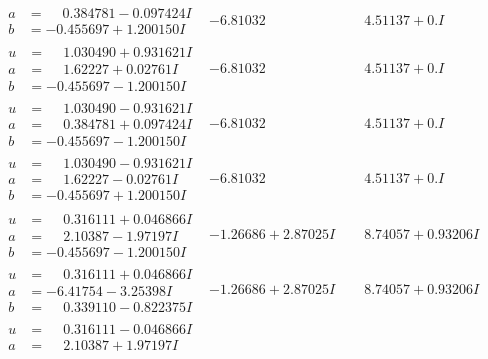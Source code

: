 \documentclass[1p]{elsarticle_modified}
\theoremstyle{definition}
\begin{document}
$$\begin{array}{c|c|c}
\begin{aligned}
a &= \phantom{-}0.384781 - 0.097424 I \\
b &= -0.455697 + 1.200150 I\end{aligned}
 & -6.81032\phantom{ +0.000000I} & \phantom{-}4.51137 + 0. I\phantom{ +0.000000I} \\ \hline\begin{aligned}
u &= \phantom{-}1.030490 + 0.931621 I \\
a &= \phantom{-}1.62227 + 0.02761 I \\
b &= -0.455697 - 1.200150 I\end{aligned}
 & -6.81032\phantom{ +0.000000I} & \phantom{-}4.51137 + 0. I\phantom{ +0.000000I} \\ \hline\begin{aligned}
u &= \phantom{-}1.030490 - 0.931621 I \\
a &= \phantom{-}0.384781 + 0.097424 I \\
b &= -0.455697 - 1.200150 I\end{aligned}
 & -6.81032\phantom{ +0.000000I} & \phantom{-}4.51137 + 0. I\phantom{ +0.000000I} \\ \hline\begin{aligned}
u &= \phantom{-}1.030490 - 0.931621 I \\
a &= \phantom{-}1.62227 - 0.02761 I \\
b &= -0.455697 + 1.200150 I\end{aligned}
 & -6.81032\phantom{ +0.000000I} & \phantom{-}4.51137 + 0. I\phantom{ +0.000000I} \\ \hline\begin{aligned}
u &= \phantom{-}0.316111 + 0.046866 I \\
a &= \phantom{-}2.10387 - 1.97197 I \\
b &= -0.455697 - 1.200150 I\end{aligned}
 & -1.26686 + 2.87025 I & \phantom{-}8.74057 + 0.93206 I \\ \hline\begin{aligned}
u &= \phantom{-}0.316111 + 0.046866 I \\
a &= -6.41754 - 3.25398 I \\
b &= \phantom{-}0.339110 - 0.822375 I\end{aligned}
 & -1.26686 + 2.87025 I & \phantom{-}8.74057 + 0.93206 I \\ \hline\begin{aligned}
u &= \phantom{-}0.316111 - 0.046866 I \\
a &= \phantom{-}2.10387 + 1.97197 I \\

\end{aligned}
\end{array}$$
\end{document}
